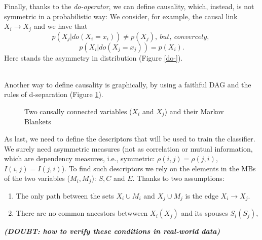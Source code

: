 Finally, thanks to the \textit{do-operator}, we can define causality, which, instead, is not symmetric in a probabilistic way: We consider, for example, the causal link $X_i \rightarrow X_j$ and we have that $$p(X_j|do(X_i = x_i)) \neq p(X_j), \ but, \ convercely, \ $$  $$p(X_i|do(X_j = x_j)) = p(X_i).$$ Here stands the asymmetry in distribution (Figure \ref{do-}).\\

\

Another way to define causality is graphically, by using a faithful DAG and the rules of d-separation (Figure \ref{fig1}).\\

\begin{figure}[!h]
\centering
{}
\caption{ Two causally connected variables ($X_i$ and $X_j$) and their Markov Blankets}
\label{fig1}
\end{figure}

As last, we need to define the descriptors that will be used to train the classifier. We surely need asymmetric measures (not as correlation or mutual information, which are dependency measures, i.e., symmetric: $\rho(i,j) = \rho(j,i)$, $I(i,j) = I(j,i)$). To find such descriptors we rely on the elements in the MBs of the two variables ($M_i, M_j$): $S, C$ and $E$. Thanks to two assumptions: 
\begin{enumerate}
    \item The only path between the sets $X_i \cup M_i$ and $X_j \cup M_j$ is the edge $X_i \rightarrow X_j$.
    \item There are no common ancestors betwween $X_i(X_j)$ and its spouses $S_i(S_j),$
\end{enumerate}
\textbf{\textit{(DOUBT: how to verify these conditions in real-world data)}}

